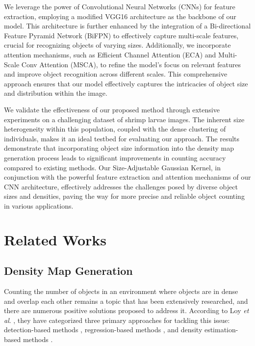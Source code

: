 \documentclass[journal]{IEEEtran}
\begin{document}
We leverage the power of Convolutional Neural Networks (CNNs) for feature extraction, employing a modified VGG16 architecture as the backbone of our model. This architecture is further enhanced by the integration of a Bi-directional Feature Pyramid Network (BiFPN\cite{bifpn}) to effectively capture multi-scale features, crucial for recognizing objects of varying sizes. Additionally, we incorporate attention mechanisms, such as Efficient Channel Attention (ECA\cite{eca}) and Multi-Scale Conv Attention (MSCA\cite{eca}), to refine the model's focus on relevant features and improve object recognition across different scales. This comprehensive approach ensures that our model effectively captures the intricacies of object size and distribution within the image.

We validate the effectiveness of our proposed method through extensive experiments on a challenging dataset of shrimp larvae images. The inherent size heterogeneity within this population, coupled with the dense clustering of individuals, makes it an ideal testbed for evaluating our approach. The results demonstrate that incorporating object size information into the density map generation process leads to significant improvements in counting accuracy compared to existing methods. Our Size-Adjustable Gaussian Kernel, in conjunction with the powerful feature extraction and attention mechanisms of our CNN architecture, effectively addresses the challenges posed by diverse object sizes and densities, paving the way for more precise and reliable object counting in various applications.

\section{Related Works}
\subsection{Density Map Generation}
Counting the number of objects in an environment where objects are in dense and overlap each other remains a topic that has been extensively researched, and there are numerous positive solutions proposed to address it. According to Loy \textit{et al}. \cite{loy2013crowd}, they have categorized three primary approaches for tackling this issue: detection-based methods \cite{shrimp_yolo1,shrimp_yolo2,yolo3, det1, shrimp_det2, shrimp_rcnn1,shrimp_rcnn2,rcnn3}, regression-based methods \cite{shrimp_seg1,shrimp_seg2,shrimp_seg3,shrimp_seg4,shrimp_seg5,shrimp_seg6}, and density estimation-based methods \cite{shrimp_density_1, shrimp_density_2, shrimp_density_3, mcnn, sanet, csrnet, cffnet, can, tednet, sfanet, dm, sganet, bayesian}.
\end{document}
